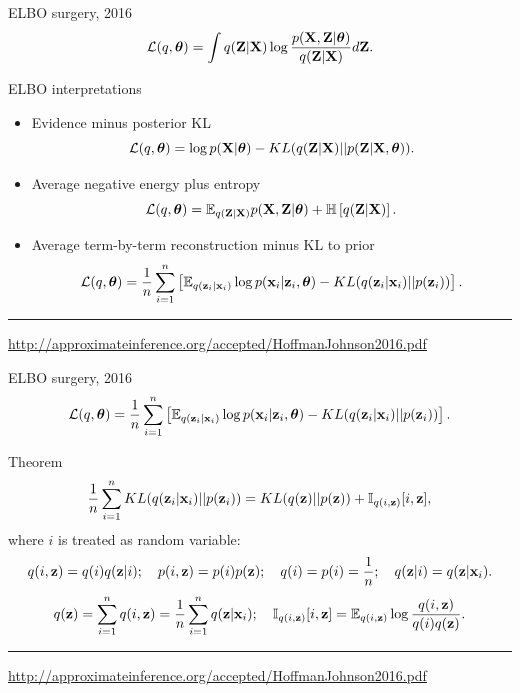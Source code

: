 \begin{frame}{ELBO surgery, 2016}
		\[
			\mathcal{L} (q, \boldsymbol{\theta})  = \int q(\mathbf{Z} | \mathbf{X}) \log \frac{p(\mathbf{X}, \mathbf{Z} | \boldsymbol{\theta})}{q(\mathbf{Z} | \mathbf{X})} d\mathbf{Z}.
		\]
		\vspace{-0.1cm}
	\begin{block}{ELBO interpretations}
	\begin{itemize}
	    \item Evidence minus posterior KL
	    \vspace{-0.1cm}
	    \[
	        \mathcal{L}(q, \boldsymbol{\theta}) = \log p(\mathbf{X} | \boldsymbol{\theta}) - KL(q(\mathbf{Z} | \mathbf{X}) || p(\mathbf{Z} | \mathbf{X}, \boldsymbol{\theta})).
	    \]
	    \item Average negative energy plus entropy
	    \vspace{-0.1cm}
	    \[
	        \mathcal{L}(q, \boldsymbol{\theta}) = \mathbb{E}_{q(\mathbf{Z} | \mathbf{X})} p(\mathbf{X}, \mathbf{Z} | \boldsymbol{\theta}) + \mathbb{H} \left[q(\mathbf{Z} | \mathbf{X}) \right].
	    \]
	    \item Average term-by-term reconstruction minus KL to prior
	    \vspace{-0.1cm}
	    \[
	        \mathcal{L}(q, \boldsymbol{\theta}) = \frac{1}{n} \sum_{i=1}^n \left[ \mathbb{E}_{q(\mathbf{z}_i | \mathbf{x}_i)} \log p(\mathbf{x}_i | \mathbf{z}_i, \boldsymbol{\theta}) - KL(q(\mathbf{z}_i | \mathbf{x}_i) || p(\mathbf{z}_i)) \right].
	    \]
	\end{itemize}
	\end{block}
	
	\vfill
	\hrule\medskip
	{\scriptsize \href{http://approximateinference.org/accepted/HoffmanJohnson2016.pdf}{http://approximateinference.org/accepted/HoffmanJohnson2016.pdf}}
\end{frame}
\begin{frame}{ELBO surgery, 2016}
\vspace{-0.3cm}
\[
    \mathcal{L}(q, \boldsymbol{\theta}) = \frac{1}{n} \sum_{i=1}^n \left[ \mathbb{E}_{q(\mathbf{z}_i | \mathbf{x}_i)} \log p(\mathbf{x}_i | \mathbf{z}_i, \boldsymbol{\theta}) - KL(q(\mathbf{z}_i | \mathbf{x}_i) || p(\mathbf{z}_i)) \right].
\]
\vspace{-0.3cm}
\begin{block}{Theorem}
\[
    \frac{1}{n} \sum_{i=1}^n KL(q(\mathbf{z}_i | \mathbf{x}_i) || p(\mathbf{z}_i)) = KL(q(\mathbf{z}) || p(\mathbf{z})) + \mathbb{I}_{q(i, \mathbf{z})} [i, \mathbf{z}],
\]
where $i$ is treated as random variable:
\footnotesize{
\[
    q(i, \mathbf{z}) = q(i) q(\mathbf{z} | i); \quad p(i, \mathbf{z}) = p(i) p(\mathbf{z}); \quad 
    q(i) = p(i) = \frac{1}{n}; \quad q(\mathbf{z} | i) = q(\mathbf{z} | \mathbf{x}_i).
\]
\[
    q(\mathbf{z}) = \sum_{i=1}^n q(i, \mathbf{z}) = \frac{1}{n} \sum_{i=1}^n q(\mathbf{z} | \mathbf{x}_i); \quad  \mathbb{I}_{q(i, \mathbf{z})} [i, \mathbf{z}] = \mathbb{E}_{q(i, \mathbf{z})} \log \frac{q(i, \mathbf{z})}{q(i)q(\mathbf{z})}.
\]
}
\end{block}

\vfill
\hrule\medskip
{\scriptsize \href{http://approximateinference.org/accepted/HoffmanJohnson2016.pdf}{http://approximateinference.org/accepted/HoffmanJohnson2016.pdf}}
\end{frame}
